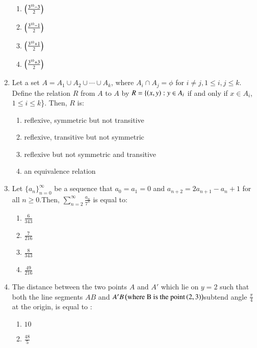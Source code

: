 \documentclass[journal,12pt,twocolumn]{IEEEtran}
\theoremstyle{remark}
\begin{document}
\begin{enumerate}
\begin{multicols}{2}
\begin{enumerate}
    \item $\left(\frac{3^{10}-3}{2}\right)$
    \item $\left(\frac{3^{10}-1}{2}\right)$
    \item $\left(\frac{3^{10}+1}{2}\right)$
    \item $\left(\frac{3^{10}+3}{2}\right)$
\end{enumerate}
\end{multicols}
\bigskip
\item Let a set $A=A_1 \cup A_2 \cup \cdots \cup A_k$, where $A_i \cap A_j=\phi$ for $i\neq j,1\leq i,j\leq k$. Define the relation $R$ from $A$ to $A$ by $R=\{\left(x,y\right):y\in A_i$ if and only if $x \in A_i$, $1\leq i \leq k$\}. Then, $R$ is:
\begin{multicols}{2}
\begin{enumerate}
    \item reflexive, symmetric but not transitive
    \item reflexive, transitive but not symmetric
    \item reflexive but not symmetric and transitive
    \item an equivalence relation 
\end{enumerate}
\end{multicols}
\bigskip
\item Let $\{a_n\}_{n=0}^{\infty}$ be a sequence that $a_0=a_1=0$ and $a_{n+2}=2a_{n+1}-a_n+1$ for all $n \geq 0$.Then, $\sum_{n=2}^{\infty}\frac{a_n}{7^n}$ is equal to: 
\begin{multicols}{2}
\begin{enumerate}
    \item $\frac{6}{343}$
    \item $\frac{7}{216}$
    \item $\frac{8}{343}$
    \item $\frac{49}{216}$
\end{enumerate}
\end{multicols}
\bigskip
\item The distance between the two points $A$ and $A'$ which lie on $y=2$ such that both the line segments $AB$ and $A'B\left(\text{where B is the point}\left(2,3\right)\right)$subtend angle $\frac{\pi}{4}$ at the origin, is equal to :
\begin{multicols}{2}
\begin{enumerate}
    \item $10$
    \item $\frac{48}{5}$

\end{enumerate}
\end{multicols}
\end{enumerate}
\end{document}
